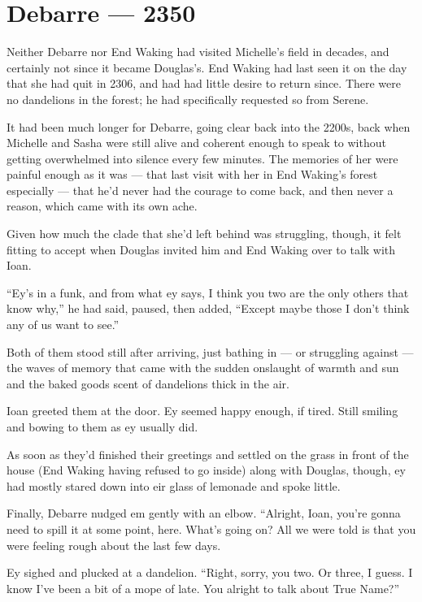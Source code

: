 \hypertarget{debarre-2350}{%
\chapter{Debarre — 2350}\label{debarre-2350}}

Neither Debarre nor End Waking had visited Michelle's field in decades, and certainly not since it became Douglas's. End Waking had last seen it on the day that she had quit in 2306, and had had little desire to return since. There were no dandelions in the forest; he had specifically requested so from Serene.

It had been much longer for Debarre, going clear back into the 2200s, back when Michelle and Sasha were still alive and coherent enough to speak to without getting overwhelmed into silence every few minutes. The memories of her were painful enough as it was — that last visit with her in End Waking's forest especially — that he'd never had the courage to come back, and then never a reason, which came with its own ache.

Given how much the clade that she'd left behind was struggling, though, it felt fitting to accept when Douglas invited him and End Waking over to talk with Ioan.

``Ey's in a funk, and from what ey says, I think you two are the only others that know why,'' he had said, paused, then added, ``Except maybe those I don't think any of us want to see.''

Both of them stood still after arriving, just bathing in — or struggling against — the waves of memory that came with the sudden onslaught of warmth and sun and the baked goods scent of dandelions thick in the air.

Ioan greeted them at the door. Ey seemed happy enough, if tired. Still smiling and bowing to them as ey usually did.

As soon as they'd finished their greetings and settled on the grass in front of the house (End Waking having refused to go inside) along with Douglas, though, ey had mostly stared down into eir glass of lemonade and spoke little.

Finally, Debarre nudged em gently with an elbow. ``Alright, Ioan, you're gonna need to spill it at some point, here. What's going on? All we were told is that you were feeling rough about the last few days.

Ey sighed and plucked at a dandelion. ``Right, sorry, you two. Or three, I guess. I know I've been a bit of a mope of late. You alright to talk about True Name?''

